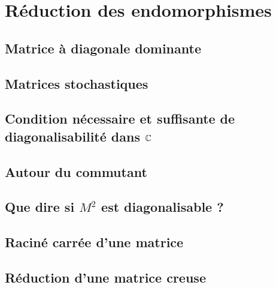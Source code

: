 \chapter{Réduction des endomorphismes}



\newpage

\section{Matrice à diagonale dominante}


\section{Matrices stochastiques}


\section{Condition nécessaire et suffisante de diagonalisabilité dans \texorpdfstring{$\mathbb{C}$}{C}}


\section{Autour du commutant}


\section{Que dire si \texorpdfstring{$M^2$}{M^2} est diagonalisable ?}


\section{Raciné carrée d'une matrice}


\section{Réduction d'une matrice creuse}


